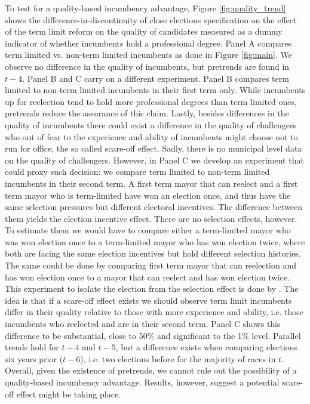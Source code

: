 \documentclass[12pt]{amsart}
\numberwithin{equation}{section}
\theoremstyle{definition}
\theoremstyle{definition}
\theoremstyle{definition}
\begin{document}
To test for a quality-based incumbency advantage, Figure \ref{fig:quality_trend} shows the difference-in-discontinuity of close elections specification on the effect of the term limit reform on the quality of candidates measured as a dummy indicator of whether incumbents hold a professional degree. Panel A compares term limited vs. non-term limited incumbents as done in Figure \ref{fig:main}. We observe no difference in the quality of incumbents, but pretrends are found in $t-4$. Panel B and C carry on a different experiment. Panel B compares term limited to non-term limited incumbents in their first term only. While incumbents up for reelection tend to hold more professional degrees than term limited ones, pretrends reduce the assurance of this claim. Lastly, besides differences in the quality of incumbents there could exist a difference in the quality of challengers who out of fear to the experience and ability of incumbents might choose not to run for office, the so called scare-off effect. Sadly, there is no municipal level data on the quality of challengers. However, in Panel C we develop an experiment that could proxy such decision: we compare term limited to non-term limited incumbents in their second term. A first term mayor that can reelect and a first term mayor who is term-limited have won an election once, and thus have the same selection pressures but different electoral incentives. The difference between them yields the election incentive effect. There are no selection effects, however. To estimate them we would have to compare either a term-limited mayor who was won election once to a term-limited mayor who has won election twice, where both are facing the same election incentives but hold different selection histories. The same could be done by comparing first term mayor that can reelection and has won election once to a mayor that can reelect and has won election twice. This experiment to isolate the election from the selection effect is done by \citet{ashworth_2012}. The idea is that if a scare-off effect exists we should observe term limit incumbents differ in their quality relative to those with more experience and ability, i.e. those incumbents who reelected and are in their second term. Panel C shows this difference to be substantial, close to 50\% and significant to the 1\% level. Parallel trends hold for $t-4$ and $t-5$, but a difference exists when comparing elections six years prior ($t-6$), i.e. two elections before for the majority of races in $t$. Overall, given the existence of pretrends, we cannot rule out the possibility of a quality-based incumbency advantage. Results, however, suggest a potential scare-off effect might be taking place. 
\end{document}
